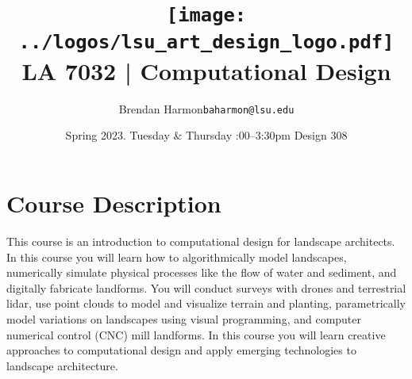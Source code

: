 \documentclass[11pt,article,oneside]{memoir}
\makeatletter
\def\myauthor{Author}
\def\mytitle{Title}
\def\myemail{baharmon@lsu.edu}
\def\myauthor{Brendan Harmon}
\def\mytitle{ \texttt{[image: ../logos/lsu\_art\_design\_logo.pdf]} \\[0.1cm] {\normalfont \normalsize LA 7032 |} \Large Computational Design}
\newcommand{\globalcolor}[1]{%
  \color{#1}\global\let\default@color\current@color
}
\makeatother
\begin{document}
\setlength\bibitemsep{0.5em}

\setmainfont{IBM Plex Sans}
\setmonofont[Scale=0.8]{IBM Plex Mono}

\def\ind{\hangindent=1 true cm\hangafter=1 \noindent}
\def\labelitemi{$\cdot$}

\title{\LARGE \mytitle}
\author{\Large\myauthor \newline \footnotesize\texttt{\noindent\myemail}}
\date{Spring 2023. \newline Tuesday \& Thursday :00--3:30pm \newline Design 308}
\published{\,}


\globalcolor{black}
\vspace*{-10em}
\maketitle
{}
\clearpage



\globalcolor{black}

\vspace*{-10em}
\maketitle

\section{Course Description}

This course is an introduction to 
computational design for landscape architects.
In this course you will learn how to 
algorithmically model landscapes,
numerically simulate physical processes 
like the flow of water and sediment,
and digitally fabricate landforms.  
You will conduct surveys with drones and terrestrial lidar,
use point clouds to model and visualize terrain and planting,
parametrically model variations on landscapes
using visual programming, 
and computer numerical control (CNC) mill landforms. 
In this course you will 
learn creative approaches to computational design 
and apply emerging technologies to landscape architecture.
\\
\end{document}
